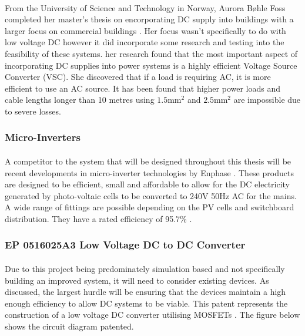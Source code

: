 \paragraph{}
From the University of Science and Technology in Norway, Aurora Bøhle Foss completed her master's thesis on encorporating DC supply into buildings with a larger focus on commercial buildings \cite{Foss2014}. Her focus wasn't specifically to do with low voltage DC however it did incorporate some research and testing into the feasibility of these systems. her research found that the most important aspect of incorporating DC supplies into power systems is a highly efficient Voltage Source Converter (VSC). She discovered that if a load is requiring AC, it is more efficient to use an AC source. It has been found that higher power loads and cable lengths longer than 10 metres using  $1.5\text{mm}^{2}$ and  $2.5\text{mm}^{2}$ are impossible due to severe losses.

\subsubsection{Micro-Inverters}

\paragraph{}
A competitor to the system that will be designed throughout this thesis will be recent developments in micro-inverter technologies by Enphase \cite{website:Enphase}. These products are designed to be efficient, small and affordable to allow for the DC electricity generated by photo-voltaic cells to be converted to 240V 50Hz AC for the mains. A wide range of fittings are possible depending on the PV cells and switchboard distribution. They have a rated efficiency of 95.7\% \cite{website:Enphase}.       

\subsubsection{EP 0516025A3 Low Voltage DC to DC Converter}

\paragraph{}
Due to this project being predominately simulation based and not specifically building an improved system, it will need to consider existing devices. As discussed, the largest hurdle will be ensuring that the devices maintain a high enough efficiency to allow DC systems to be viable. This patent represents the construction of a low voltage DC converter utilising MOSFETs \cite{Hulsey1992}. The figure below shows the circuit diagram patented. 

